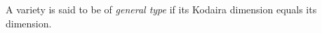 \documentclass[12pt]{article}
\begin{document}
A variety is said to be of {\em general type} if its Kodaira dimension equals its dimension.
\end{document}

